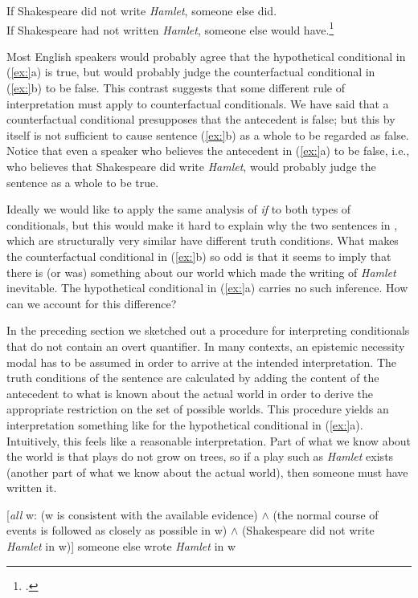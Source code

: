 \ea
\ea If Shakespeare did not write \textit{Hamlet}, someone else did.\\
\ex If Shakespeare had not written \textit{Hamlet}, someone else would have.\footnote{\citet{Morton2004}.}
                       \z
\z


Most English speakers would probably agree that the hypothetical conditional in (\ref{ex:}a) is true, but would probably judge the counterfactual conditional in (\ref{ex:}b) to be false. This contrast suggests that some different rule of interpretation must apply to counterfactual conditionals. We have said that a counterfactual conditional presupposes that the antecedent is false; but this by itself is not sufficient to cause sentence (\ref{ex:}b) as a whole to be regarded as false. Notice that even a speaker who believes the antecedent in (\ref{ex:}a) to be false, i.e., who believes that Shakespeare did write \textit{Hamlet}, would probably judge the sentence as a whole to be true.



Ideally we would like to apply the same analysis of \textit{if} to both types of conditionals, but this would make it hard to explain why the two sentences in , which are structurally very similar have different truth conditions. What makes the counterfactual conditional in (\ref{ex:}b) so odd is that it seems to imply that there is (or was) something about our world which made the writing of \textit{Hamlet} inevitable. The hypothetical conditional in (\ref{ex:}a) carries no such inference. How can we account for this difference?



In the preceding section we sketched out a procedure for interpreting conditionals that do not contain an overt quantifier. In many contexts, an epistemic necessity modal has to be assumed in order to arrive at the intended interpretation. The truth conditions of the sentence are calculated by adding the content of the antecedent to what is known about the actual world in order to derive the appropriate restriction on the set of possible worlds. This procedure yields an interpretation something like  for the hypothetical conditional in (\ref{ex:}a). Intuitively, this feels like a reasonable interpretation. Part of what we know about the world is that plays do not grow on trees, so if a play such as \textit{Hamlet} exists (another part of what we know about the actual world), then someone must have written it.


\ea
{}[\textit{all} w: (w is consistent with the available evidence) $\wedge$ (the normal course of events is followed as closely as possible in w) $\wedge$ (Shakespeare did not write \textit{Hamlet} in w)] someone else wrote \textit{Hamlet} in w
\z



